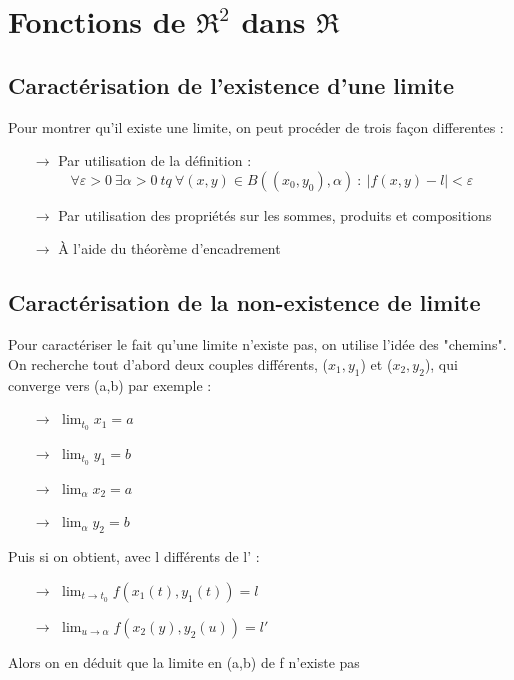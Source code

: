 \documentclass[a4paper,12 pt,oneside]{report}     %
\begin{document}
\chapter{Fonctions de $\Re^2$ dans $\Re$}
\section{Caractérisation de l'existence d'une limite}
Pour montrer qu'il existe une limite, on peut procéder de trois façon differentes : 
\begin{itemize}
 \item[$\rightarrow$] Par utilisation de la définition : $$\forall \varepsilon > 0~ \exists \alpha > 0~ tq~ \forall (x,y)\in B((x_0,y_0),\alpha)~ :~ |f(x,y) -l| < \varepsilon$$
 \item[$\rightarrow$] Par utilisation des propriétés sur les sommes, produits et compositions
 \item[$\rightarrow$] À l'aide du théorème d'encadrement
\end{itemize}
\section{Caractérisation de la non-existence de limite}
Pour caractériser le fait qu'une limite n'existe pas, on utilise l'idée des "chemins".\\
On recherche tout d'abord deux couples différents, ($x_1,y_1$) et ($x_2,y_2$), qui converge vers (a,b) par exemple :  
\begin{itemize}
 \item[$\rightarrow$] $\lim_{t_0} x_1 = a$ 
 \item[$\rightarrow$] $\lim_{t_0} y_1 = b$ 
 \item[$\rightarrow$] $\lim_{\alpha} x_2 = a$ 
 \item[$\rightarrow$] $\lim_{\alpha} y_2 = b$ 
\end{itemize}
Puis si on obtient, avec l différents de l' :
\begin{itemize}
 \item[$\rightarrow$] $\lim_{t \rightarrow t_0} f(x_1(t),y_1(t)) = l$
 \item[$\rightarrow$] $\lim_{u \rightarrow \alpha} f(x_2(y),y_2(u)) = l'$
\end{itemize}
Alors on en déduit que la limite en (a,b) de f n'existe pas
\end{document}
